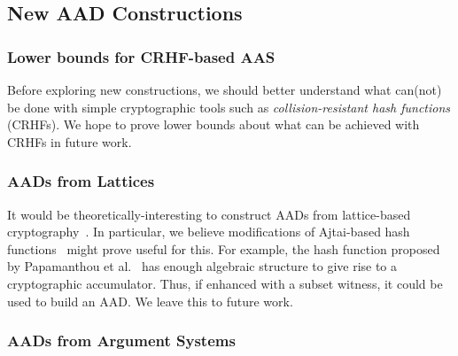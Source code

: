 \subsection{New AAD Constructions}

\subsubsection{Lower bounds for CRHF-based AAS}
Before exploring new constructions, we should better understand what can(not) be done with simple cryptographic tools such as \textit{collision-resistant hash functions} (CRHFs).
We hope to prove lower bounds about what can be achieved with CRHFs in future work.

\subsubsection{AADs from Lattices}
It would be theoretically-interesting to construct AADs from lattice-based cryptography~\cite{Peikert15}.
In particular, we believe modifications of Ajtai-based hash functions~\cite{Ajtai96,GGH11} might prove useful for this.
For example, the hash function proposed by Papamanthou et al.~\cite{PSTY13} has enough algebraic structure to give rise to a cryptographic accumulator.
Thus, if enhanced with a subset witness, it could be used to build an AAD.
We leave this to future work.

\subsubsection{AADs from Argument Systems}
\label{s:snarks}
%
%
%

